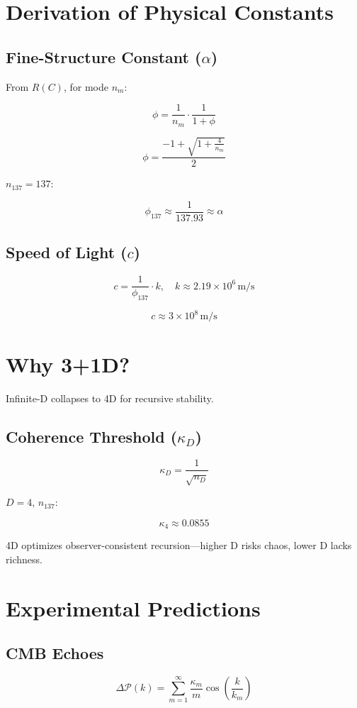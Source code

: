 \documentclass[12pt]{article}
\begin{document}
\section{Derivation of Physical Constants}

\subsection{Fine-Structure Constant (\(\alpha\))}
From \( R(C) \), for mode \( n_m \):

\[
\phi = \frac{1}{n_m} \cdot \frac{1}{1 + \phi}
\]

\[
\phi = \frac{-1 + \sqrt{1 + \frac{4}{n_m}}}{2}
\]

\( n_{137} = 137 \):

\[
\phi_{137} \approx \frac{1}{137.93} \approx \alpha
\]

\subsection{Speed of Light (\(c\))}
\[
c = \frac{1}{\phi_{137}} \cdot k, \quad k \approx 2.19 \times 10^6 \, \text{m/s}
\]

\[
c \approx 3 \times 10^8 \, \text{m/s}
\]

\section{Why 3+1D?}

Infinite-D collapses to 4D for recursive stability.

\subsection{Coherence Threshold (\(\kappa_D\))}
\[
\kappa_D = \frac{1}{\sqrt{n_D}}
\]

\( D = 4 \), \( n_{137} \):

\[
\kappa_4 \approx 0.0855
\]

4D optimizes observer-consistent recursion—higher D risks chaos, lower D lacks richness.

\section{Experimental Predictions}

\subsection{CMB Echoes}
\[
\Delta \mathcal{P}(k) = \sum_{m=1}^\infty \frac{\kappa_m}{m} \cos\left(\frac{k}{k_m}\right)
\]
\end{document}
